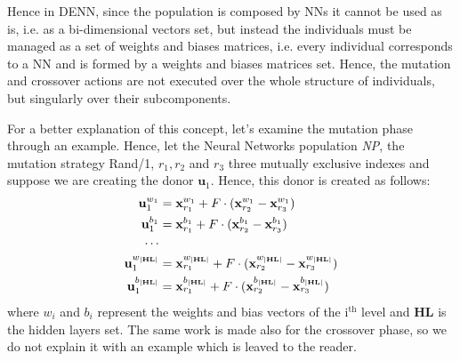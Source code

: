 Hence in DENN, since the population is composed by NNs it cannot be used as is, i.e. as a bi-dimensional vectors set, but instead the individuals must be managed as a set of weights and biases matrices, i.e. every individual corresponds to a NN and is formed by a weights and biases matrices set. Hence, the mutation and crossover actions are not executed over the whole structure of individuals, but singularly over their subcomponents. 

For a better explanation of this concept, let's examine the mutation phase through an example. Hence, let the Neural Networks population \textit{NP}, the mutation strategy Rand/1, $r_1, r_2$ and $r_3$ three mutually exclusive indexes and suppose we are creating the donor $\textbf{u}_{1}$. Hence, this donor is created as follows:
\begin{align}
	\textbf{u}_{1}^{w_1} &= \textbf{x}_{r_1}^{w_1} + F \cdot (\textbf{x}_{r_2}^{w_1} - \textbf{x}_{r_3}^{w_1}) \\
	\textbf{u}_{1}^{b_1} &= \textbf{x}_{r_1}^{b_1} + F \cdot (\textbf{x}_{r_2}^{b_1} - \textbf{x}_{r_3}^{b_1}) \\
	\cdots \cr
	\textbf{u}_{1}^{w_{|\textbf{HL}|}} &= \textbf{x}_{r_1}^{w_{|\textbf{HL}|}} + F \cdot (\textbf{x}_{r_2}^{w_{|\textbf{HL}|}} - \textbf{x}_{r_3}^{w_{|\textbf{HL}|}}) \\
	\textbf{u}_{1}^{b_{|\textbf{HL}|}} &= \textbf{x}_{r_1}^{b_{|\textbf{HL}|}} + F \cdot (\textbf{x}_{r_2}^{b_{|\textbf{HL}|}} - \textbf{x}_{r_3}^{b_{|\textbf{HL}|}})
\end{align}
where $w_i$ and $b_i$ represent the weights and bias vectors of the $\textrm{i}^{\textrm{th}}$ level and \textbf{HL} is the hidden layers set. The same work is made also for the crossover phase, so we do not explain it with an example which is leaved to the reader.

